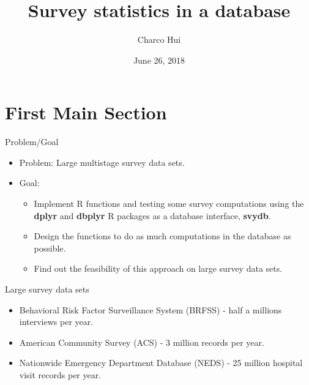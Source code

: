 \documentclass{beamer}
\title{Survey statistics in a database}
\author{Charco Hui}
\institute[Universitiy of Auckland] %
{Supervisor: Professor Thomas Lumley\\
The University of Auckland\\
Department of Statistics}
\date{June 26, 2018}
\begin{document}
\begin{frame}
  \titlepage
\end{frame}


\section{First Main Section}


\begin{frame}{Problem/Goal}
\begin{itemize}
    \item{Problem: Large multistage survey data sets.}
    
    \pause
    
    \item{Goal:\\
        \begin{itemize}
          \item {
            Implement {\sf R} functions and testing some survey computations using the {\bf dplyr} \citep{dplyrpackage} and {\bf dbplyr} \citep{dbplyrpackage} {\sf R} packages as a database interface, {\bf svydb}.
          }
          \item {
            Design the functions to do as much computations in the database as possible.
          }
          \item {
            Find out the feasibility of this approach on large survey data sets.
          }
        \end{itemize}    
    }
\end{itemize}

    
\end{frame}


\begin{frame}{Large survey data sets}
  \begin{itemize}
  \item {
    Behavioral Risk Factor Surveillance System (BRFSS) - half a millions interviews per year.
  }
  \item {
    American Community Survey (ACS) - 3 million records per year. 
  }
    \item {
    Nationwide Emergency Department Database (NEDS) - 25 million hospital visit records per year. 
  }
  \end{itemize}
\end{frame}
\end{document}
